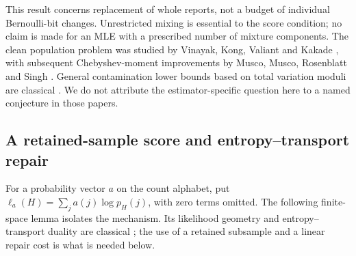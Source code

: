 \documentclass[11pt,a4paper]{article}
\theoremstyle{definition}
\theoremstyle{remark}
\numberwithin{equation}{section}
\begin{document}
This result concerns replacement of whole reports, not a budget of
individual Bernoulli-bit changes.  Unrestricted mixing is essential to
the score condition; no claim is made for an MLE with a prescribed
number of mixture components.  The clean population problem was studied
by Vinayak, Kong, Valiant and Kakade \cite{p8:BT_VKVK2019}, with subsequent
Chebyshev-moment improvements by Musco, Musco, Rosenblatt and Singh
\cite{p3:RT_MMRS2025}.  General contamination lower bounds based on total
variation moduli are classical \cite{p3:RT_CGR2016}.  We do not attribute
the estimator-specific question here to a named conjecture in those
papers.

\subsection{A retained-sample score and entropy--transport repair}

For a probability vector $a$ on the count alphabet, put
$\ell_a(H)=\sum_j a(j)\log p_H(j)$, with zero terms omitted.
The following finite-space lemma isolates the mechanism.  Its
likelihood geometry and entropy--transport duality are classical
\cite{p3:RT_Lindsay1983,p3:RT_BobkovGoetze1999}; the use of a retained
subsample and a linear repair cost is what is needed below.
\end{document}
